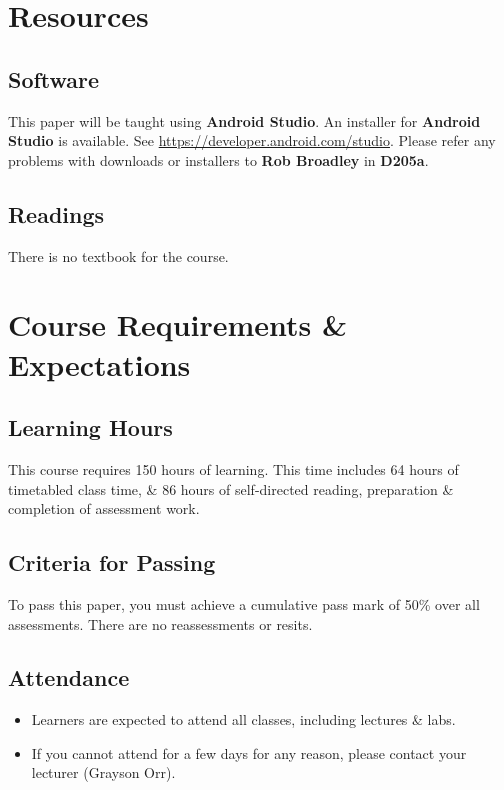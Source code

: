 \documentclass{article}
\begin{document}
\section*{Resources}

\subsection*{Software}
This paper will be taught using \textbf{Android Studio}. An installer for \textbf{Android Studio} is available. See \href{https://developer.android.com/studio}{https://developer.android.com/studio}. Please refer any problems with downloads or installers to \textbf{Rob Broadley} in \textbf{D205a}.

\subsection*{Readings}
There is no textbook for the course.

\section*{Course Requirements \& Expectations}

\subsection*{Learning Hours}
This course requires 150 hours of learning. This time includes 64 hours of timetabled class time, \& 86 hours of self-directed reading, preparation \& completion of assessment work.

\subsection*{Criteria for Passing}
To pass this paper, you must achieve a cumulative pass mark of 50\% over all assessments. There are no reassessments or resits.

\subsection*{Attendance}
\begin{itemize}
	\item Learners are expected to attend all classes, including lectures \& labs.
	\item If you cannot attend for a few days for any reason, please contact your lecturer (Grayson Orr).
\end{itemize}
\end{document}
